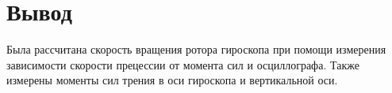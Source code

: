 \section{Вывод}
Была рассчитана скорость вращения ротора гироскопа при помощи измерения зависимости
скорости прецессии от момента сил и осциллографа. Также измерены моменты сил трения
в оси гироскопа и вертикальной оси.